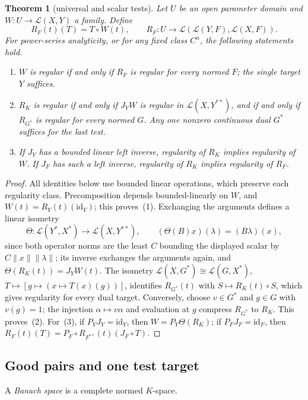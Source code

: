 \documentclass[11pt]{amsart}
\newtheorem{theorem}{Theorem}[section]
\theoremstyle{definition}
\theoremstyle{remark}
\numberwithin{equation}{section}
\newcommand{\cL}{\mathcal L}
\newcommand{\id}{\mathrm{id}}
\newcommand{\norm}[1]{\lVert #1\rVert}
\theoremstyle{plain}
\theoremstyle{definition}
\theoremstyle{plain}
\begin{document}
\begin{theorem}[universal and scalar tests]\label{thm:duality}
Let $U$ be an open parameter domain and $W\colon U\to\cL(X,Y)$ a family. Define
\[
 R_F(t)(T)=T\circ W(t),\qquad
 R_F\colon U\to\cL(\cL(Y,F),\cL(X,F)).
\]
For power-series analyticity, or for any fixed class $C^n$, the following statements hold.
\begin{enumerate}
\item $W$ is regular if and only if $R_F$ is regular for every normed $F$; the single target $Y$ suffices.
\item $R_K$ is regular if and only if $J_YW$ is regular in $\cL(X,Y^{**})$, and if and only if
$R_{G^*}$ is regular for every normed $G$. Any one nonzero continuous dual $G^*$ suffices for the last test.
\item If $J_Y$ has a bounded linear left inverse, regularity of $R_K$ implies regularity of $W$.
If $J_F$ has such a left inverse, regularity of $R_K$ implies regularity of $R_F$.
\end{enumerate}
\end{theorem}
\begin{proof}
All identities below use bounded linear operations, which preserve each regularity class. Precomposition depends
bounded-linearly on $W$, and $W(t)=R_Y(t)(\id_Y)$; this proves~(1). Exchanging the arguments defines a linear isometry
\[
 \Theta\colon\cL(Y^*,X^*)\longrightarrow\cL(X,Y^{**}),
 \qquad (\Theta(B)x)(\lambda)=(B\lambda)(x),
\]
since both operator norms are the least $C$ bounding the displayed scalar by $C\norm x\norm\lambda$; its inverse exchanges
the arguments again, and $\Theta(R_K(t))=J_YW(t)$. The isometry
$\cL(X,G^*)\cong\cL(G,X^*)$, $T\mapsto[g\mapsto(x\mapsto T(x)(g))]$, identifies $R_{G^*}(t)$ with $S\mapsto R_K(t)\circ S$,
which gives regularity for every dual target. Conversely, choose $v\in G^*$ and $g\in G$ with $v(g)=1$; the injection
$\alpha\mapsto v\alpha$ and evaluation at $g$ compress $R_{G^*}$ to $R_K$. This proves~(2). For~(3), if $P_YJ_Y=\id_Y$,
then $W=P_Y\Theta(R_K)$; if $P_FJ_F=\id_F$, then $R_F(t)(T)=P_F\circ R_{F^{**}}(t)(J_F\circ T)$.
\end{proof}

\subsection{Good pairs and one test target}\label{ob:ssec:good}

A \emph{Banach space} is a complete normed $K$-space.
\end{document}
